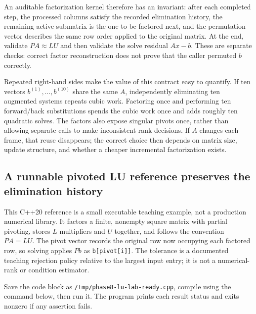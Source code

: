 An auditable factorization kernel therefore has an invariant: after each completed step, the processed columns satisfy the recorded elimination history, the remaining active submatrix is the one to be factored next, and the permutation vector describes the same row order applied to the original matrix. At the end, validate \(PA\approx LU\) and then validate the solve residual \(Ax-b\). These are separate checks: correct factor reconstruction does not prove that the caller permuted \(b\) correctly.

Repeated right-hand sides make the value of this contract easy to quantify. If ten vectors \(b^{(1)},\ldots,b^{(10)}\) share the same \(A\), independently eliminating ten augmented systems repeats cubic work. Factoring once and performing ten forward/back substitutions spends the cubic work once and adds roughly ten quadratic solves. The factors also expose singular pivots once, rather than allowing separate calls to make inconsistent rank decisions. If \(A\) changes each frame, that reuse disappears; the correct choice then depends on matrix size, update structure, and whether a cheaper incremental factorization exists.

\subsection{A runnable pivoted LU reference preserves the elimination history}\label{a-runnable-pivoted-lu-reference-preserves-the-elimination-history}

This C++20 reference is a small executable teaching example, not a production numerical library. It factors a finite, nonempty square matrix with partial pivoting, stores \(L\) multipliers and \(U\) together, and follows the convention \(PA=LU\). The pivot vector records the original row now occupying each factored row, so solving applies \(Pb\) as \texttt{b{[}pivot{[}i{]}{]}}. The tolerance is a documented teaching rejection policy relative to the largest input entry; it is not a numerical-rank or condition estimator.

Save the code block as \texttt{/tmp/phase8-lu-lab-ready.cpp}, compile using the command below, then run it. The program prints each result status and exits nonzero if any assertion fails.

